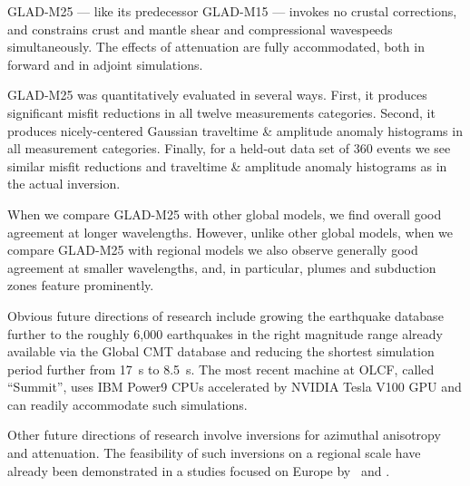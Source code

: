 \documentclass[extra,mreferee]{gji}
\begin{document}
GLAD-M25 --- like its predecessor GLAD-M15 --- invokes no crustal corrections,
and constrains crust and mantle shear and compressional wavespeeds simultaneously.
The effects of attenuation are fully accommodated,
both in forward and in adjoint simulations.

GLAD-M25 was quantitatively evaluated in several ways.
First, it produces significant misfit
reductions in all twelve measurements categories.
Second,
it produces nicely-centered Gaussian traveltime \& amplitude anomaly histograms
in all measurement categories.
Finally,
for a held-out data set of 360 events
we see similar misfit reductions and traveltime \& amplitude anomaly histograms as in the actual inversion.

When we compare GLAD-M25 with other global models,
we find overall good agreement at longer wavelengths.
However, unlike other global models, when we compare GLAD-M25 with regional models
we also observe generally good agreement at smaller wavelengths,
and, in particular, plumes and subduction zones feature prominently.

Obvious future directions of research include growing the earthquake database further to the roughly 6,000 earthquakes in the right magnitude range already available via the Global CMT database
and reducing the shortest simulation period further from 17~s to 8.5~s.
The most recent machine at OLCF, called ``Summit'', uses IBM Power9 CPUs accelerated by NVIDIA Tesla V100 GPU and can readily accommodate such simulations.

Other future directions of research involve inversions for azimuthal anisotropy
and attenuation.
The feasibility of such inversions on a regional scale have already been demonstrated in a studies focused on Europe by~\cite{ZhuTromp2013} and \cite{Zhuetal2013}.
\end{document}
